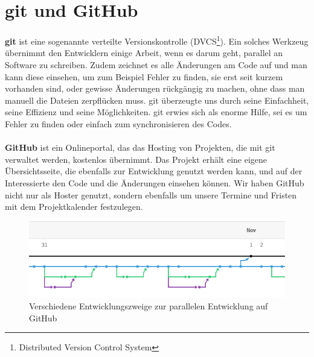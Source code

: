 \documentclass[11pt,a4paper]{scrbook}
\begin{document}
\section{git und GitHub}
\textbf{git} ist eine sogenannte verteilte Versionskontrolle (DVCS\footnote{Distributed Version Control System}). Ein solches Werkzeug übernimmt
den Entwicklern einige Arbeit, wenn es darum geht, parallel an Software zu schreiben. Zudem zeichnet es alle Änderungen am Code auf und man kann diese
einsehen, um zum Beispiel Fehler zu finden, sie erst seit kurzem vorhanden sind, oder gewisse Änderungen rückgängig zu machen, ohne dass man
manuell die Dateien zerpflücken muss. git überzeugte uns durch seine Einfachheit, seine Effizienz und seine Möglichkeiten. 
git erwies sich als enorme Hilfe, sei es um Fehler zu finden oder einfach zum synchronisieren des Codes.
\\
\\
\textbf{GitHub} ist ein
Onlineportal, das das Hosting von Projekten, die mit git verwaltet werden, kostenlos übernimmt. Das Projekt erhält eine eigene Übersichtsseite,
die ebenfalls zur Entwicklung genutzt werden kann, und auf der Interessierte den Code und die Änderungen einsehen können. Wir haben GitHub nicht nur
als Hoster genutzt, sondern ebenfalls um unsere Termine und Fristen mit dem Projektkalender festzulegen.
\begin{figure}
\centering
\includegraphics[scale=1]{img/branches.png}
\caption{Verschiedene Entwicklungszweige zur parallelen Entwicklung auf GitHub}
\label{fig:branches}
\end{figure}
\end{document}
